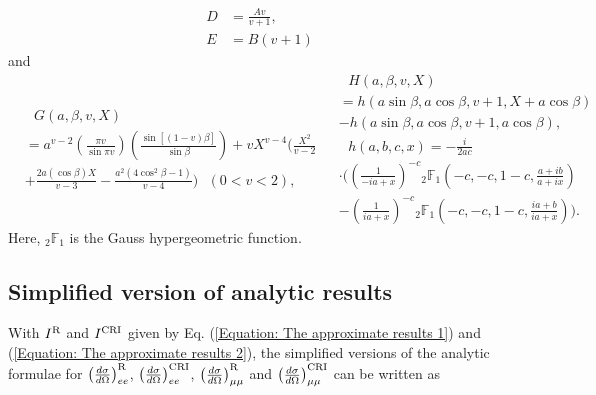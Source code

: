 \documentclass[a4paper,10pt,twoside]{cpc-hepnp}
\begin{document}
\begin{CJK*}{UTF8}{gbsn}
\begin{multicols}{2}
\begin{subequations}
\begin{align}
			D & = \frac{Av}{v+1}, \\
			E & = B(v+1)
		\end{align}
	\end{subequations}
	and
	\begin{subequations}
		\begin{align}
			&\ \ \  G(a,\beta,v,X) \nonumber \\
			& = a^{v-2} \left(\frac{\pi v}{\sin\pi v}\right) \left(\frac{\sin[(1-v)\beta]}{\sin\beta}\right) + v X^{v-4} \bigg(\frac{X^2}{v-2} \nonumber \\
			& +\frac{2a(\cos\beta) X}{v-3}-\frac{a^2(4\cos^2\beta-1)}{v-4}\bigg) \ \ \ (0<v<2),
		\end{align}
		\begin{align}
			&\ \ \  H(a,\beta,v,X) \nonumber \\
			& = h(a\sin\beta,a\cos\beta,v+1,X+a\cos\beta) \nonumber \\
			& - h(a\sin\beta,a\cos\beta,v+1,a\cos\beta), \\
			&\ \ \  h(a,b,c,x) = -\frac{i}{2ac} \nonumber \\
			& \cdot \Bigg(\left(\frac{1}{-ia+x}\right)^{-c}{}_2\mathbb{F}_1\left(-c,-c,1-c,\frac{a+ib}{a+ix}\right) \nonumber \\
			& - \left(\frac{1}{ia+x}\right)^{-c}{}_2\mathbb{F}_1\left(-c,-c,1-c,\frac{ia+b}{ia+x}\right)\Bigg).
		\end{align}
	\end{subequations}
	Here, ${}_2\mathbb{F}_1$ is the Gauss hypergeometric function.
	
	\subsection{Simplified version of analytic results}
	
	With $I^{\rm R}$ and $I^{\rm CRI}$ given by Eq. (\ref{Equation: The approximate results 1}) and (\ref{Equation: The approximate results 2}), the simplified versions of the analytic formulae for $\left(\frac{d\sigma}{d\Omega}\right)_{ee}^{\rm R}$, $\left(\frac{d\sigma}{d\Omega}\right)_{ee}^{\rm CRI}$, $\left(\frac{d\sigma}{d\Omega}\right)_{\mu\mu}^{\rm R}$ and $\left(\frac{d\sigma}{d\Omega}\right)_{\mu\mu}^{\rm CRI}$ can be written as
	
\end{multicols}


\end{CJK*}
\end{document}
